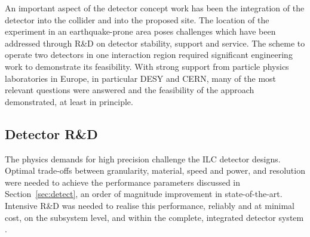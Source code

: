\documentclass[%
reprint,
 floatfix,
 amsmath,amssymb,
 aps,
]{revtex4-1}
\newcommand{\todo}[1]{\textcolor{red}{{#1}}}
\begin{document}
An important aspect of the detector concept work has been
the integration of the detector into the collider and into the
proposed site. The location of the experiment in an earthquake-prone
area poses challenges which have been addressed through R\&D on
detector stability, support and service. The scheme to operate two
detectors in one interaction region required
significant engineering work to demonstrate its
feasibility. With strong support from particle physics laboratories in
Europe, in  particular DESY and CERN, many of the most relevant
questions were answered and the feasibility
 of the approach demonstrated, at least in principle. 


\vspace{-.4cm}


\subsection{\label{sec:detectrd} Detector R\&D}

\vspace{-.3cm}



The physics demands for high precision challenge
the ILC detector designs.  Optimal 
trade-offs between
granularity, material, speed and power, and 
resolution were needed to achieve
the performance parameters  discussed
in Section~\ref{sec:detect},
an order of magnitude
improvement in state-of-the-art.
Intensive R\&D was needed to realise this performance,
reliably and at minimal cost,
on the subsystem level, and  within the complete,
integrated detector system \cite{RDliaision}.
\end{document}
